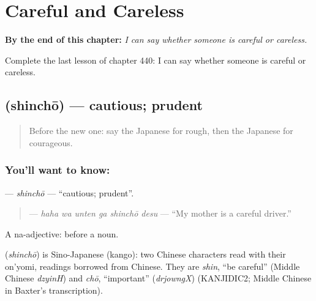 
\chapter{Careful and Careless}
\label{ch:ja-careful-and-careless}

\begin{chapteropening}
\textbf{By the end of this chapter:} \emph{I can say whether someone is careful or careless.}

Complete the last lesson of chapter 440: I can say whether someone is careful or careless.
\end{chapteropening}

\section[\texorpdfstring{\ja{しんちょう} (shinchō)}{しんちょう (shinchō)}]{ (shinchō) — cautious; prudent}

\label{lesson:JA-C440-shinchou}



\begin{quote}
Before the new one: say the Japanese for rough, then the Japanese for courageous.
\end{quote}

\subsection*{You'll want to know: }
\textbf{} — \emph{shinchō} — \textquotedblleft{}cautious; prudent\textquotedblright{}.

\begin{quote}
\textbf{  } — \emph{haha wa unten ga shinchō desu} — \textquotedblleft{}My mother is a careful driver.\textquotedblright{}
\end{quote}

A na-adjective:  before a noun.

\begin{cousinweb}
\textbf{} (\emph{shinchō}) is Sino-Japanese (kango): two Chinese characters read with their on'yomi, readings borrowed from Chinese. They are \emph{shin}, \textquotedblleft{}be careful\textquotedblright{} (Middle Chinese \emph{dzyinH}) and \emph{chō}, \textquotedblleft{}important\textquotedblright{} (\emph{drjowngX}) (KANJIDIC2; Middle Chinese in Baxter's transcription).
\end{cousinweb}

